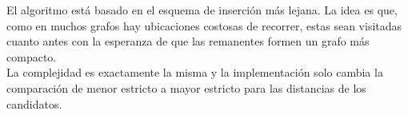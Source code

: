     El algoritmo está basado en el esquema de inserción más lejana. La idea es que, como en muchos grafos hay ubicaciones costosas de recorrer, estas sean visitadas cuanto antes con la esperanza de que las remanentes formen un grafo más compacto.
    \\

    La complejidad es exactamente la misma y la implementación solo cambia la comparación de menor estricto a mayor estricto para las distancias de los candidatos.
